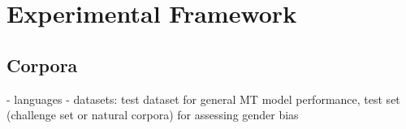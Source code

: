 \chapter{Experimental Framework}
\label{ch:Experiments}










\section{Corpora}
\label{sec:Experiments:Corpora}
- languages
- datasets: test dataset for general MT model performance, test set (challenge set or natural corpora) for assessing gender bias

